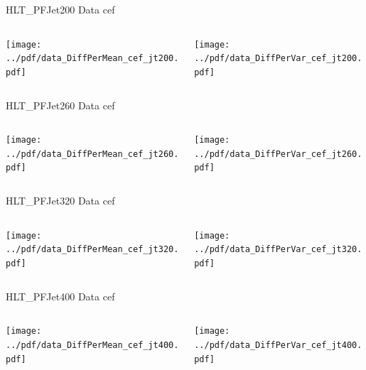 \documentclass[9pt]{beamer}
\begin{document}
\begin{frame}[t]{HLT\_PFJet200 Data cef}
\begin{columns}[T]
  \begin{column}{.5\textwidth}
  \texttt{[image: ../pdf/data\_DiffPerMean\_cef\_jt200.pdf]}
  \end{column}
  \begin{column}{.5\textwidth}
  \texttt{[image: ../pdf/data\_DiffPerVar\_cef\_jt200.pdf]}
  \end{column}
\end{columns}
\end{frame}

\begin{frame}[t]{HLT\_PFJet260 Data cef}
\begin{columns}[T]
  \begin{column}{.5\textwidth}
  \texttt{[image: ../pdf/data\_DiffPerMean\_cef\_jt260.pdf]}
  \end{column}
  \begin{column}{.5\textwidth}
  \texttt{[image: ../pdf/data\_DiffPerVar\_cef\_jt260.pdf]}
  \end{column}
\end{columns}
\end{frame}

\begin{frame}[t]{HLT\_PFJet320 Data cef}
\begin{columns}[T]
  \begin{column}{.5\textwidth}
  \texttt{[image: ../pdf/data\_DiffPerMean\_cef\_jt320.pdf]}
  \end{column}
  \begin{column}{.5\textwidth}
  \texttt{[image: ../pdf/data\_DiffPerVar\_cef\_jt320.pdf]}
  \end{column}
\end{columns}
\end{frame}

\begin{frame}[t]{HLT\_PFJet400 Data cef}
\begin{columns}[T]
  \begin{column}{.5\textwidth}
  \texttt{[image: ../pdf/data\_DiffPerMean\_cef\_jt400.pdf]}
  \end{column}
  \begin{column}{.5\textwidth}
  \texttt{[image: ../pdf/data\_DiffPerVar\_cef\_jt400.pdf]}
  \end{column}
\end{columns}
\end{frame}
\end{document}
